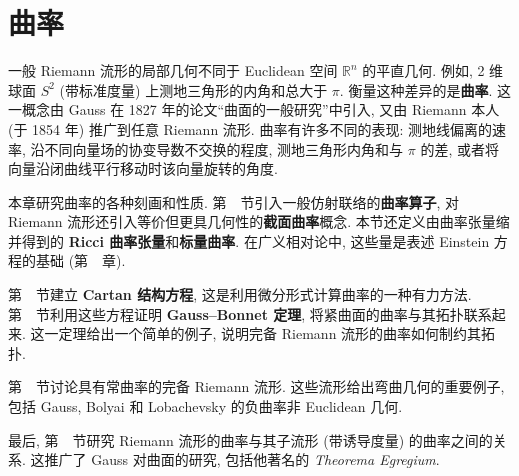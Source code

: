 \chapter{曲率}\label{chap:curvature}
\begingroup
\renewcommand{\thefootnote}{}
\endgroup

一般 Riemann 流形的局部几何不同于 Euclidean 空间 $\mathbb{R}^n$ 的平直几何. 例如, 2 维球面 $S^2$ (带标准度量) 上测地三角形的内角和总大于 $\pi$. 衡量这种差异的是\textbf{曲率}. 这一概念由 Gauss 在 1827 年的论文\textquotedblleft 曲面的一般研究\textquotedblright 中引入, 又由 Riemann 本人 (于 1854 年) 推广到任意 Riemann 流形. 曲率有许多不同的表现: 测地线偏离的速率, 沿不同向量场的协变导数不交换的程度, 测地三角形内角和与 $\pi$ 的差, 或者将向量沿闭曲线平行移动时该向量旋转的角度.

本章研究曲率的各种刻画和性质. 第~~节引入一般仿射联络的\textbf{曲率算子}, 对 Riemann 流形还引入等价但更具几何性的\textbf{截面曲率}概念. 本节还定义由曲率张量缩并得到的 \textbf{Ricci 曲率张量}和\textbf{标量曲率}. 在广义相对论中, 这些量是表述 Einstein 方程的基础 (第~~章).

第~~节建立 \textbf{Cartan 结构方程}, 这是利用微分形式计算曲率的一种有力方法. 第~~节利用这些方程证明 \textbf{Gauss–Bonnet 定理}, 将紧曲面的曲率与其拓扑联系起来. 这一定理给出一个简单的例子, 说明完备 Riemann 流形的曲率如何制约其拓扑.

第~~节讨论具有常曲率的完备 Riemann 流形. 这些流形给出弯曲几何的重要例子, 包括 Gauss, Bolyai 和 Lobachevsky 的负曲率非 Euclidean 几何.

最后, 第~~节研究 Riemann 流形的曲率与其子流形 (带诱导度量) 的曲率之间的关系. 这推广了 Gauss 对曲面的研究, 包括他著名的 \emph{Theorema Egregium}.
